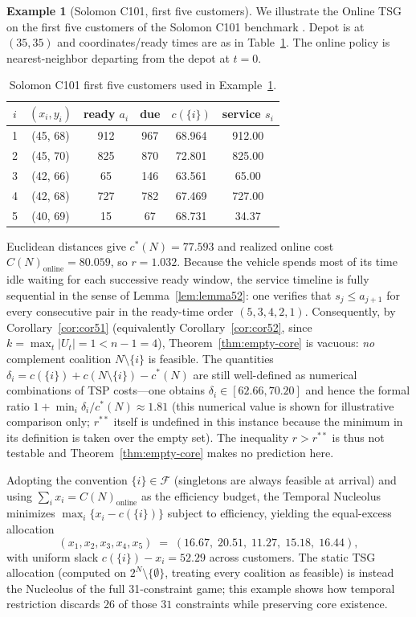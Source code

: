 \documentclass[11pt]{article}
\theoremstyle{plain}
\theoremstyle{definition}
\newtheorem{example}[theorem]{Example}
\theoremstyle{remark}
\newcommand{\F}{\mathcal{F}}
\newcommand{\cstar}{c^{\ast}}
\begin{document}
\begin{example}[Solomon C101, first five customers]
\label{ex:solomon}
We illustrate the Online TSG on the first five customers of the Solomon C101 benchmark \citep{solomon1987benchmarks}. Depot is at $(35, 35)$ and coordinates/ready times are as in Table~\ref{tab:solomon}. The online policy is nearest-neighbor departing from the depot at $t=0$.

\begin{table}[h]
\centering
\caption{Solomon C101 first five customers used in Example~\ref{ex:solomon}.}
\label{tab:solomon}
\small
\begin{tabular}{@{}cccccc@{}}
\toprule
$i$ & $(x_i, y_i)$ & ready $a_i$ & due & $c(\{i\})$ & service $s_i$ \\
\midrule
1 & (45, 68) & 912 & 967 & 68.964 & 912.00 \\
2 & (45, 70) & 825 & 870 & 72.801 & 825.00 \\
3 & (42, 66) &  65 & 146 & 63.561 &  65.00 \\
4 & (42, 68) & 727 & 782 & 67.469 & 727.00 \\
5 & (40, 69) &  15 &  67 & 68.731 &  34.37 \\
\bottomrule
\end{tabular}
\end{table}

Euclidean distances give $\cstar(N)=77.593$ and realized online cost $C(N)_{\text{online}}=80.059$, so $r = 1.032$. Because the vehicle spends most of its time idle waiting for each successive ready window, the service timeline is fully sequential in the sense of Lemma~\ref{lem:lemma52}: one verifies that $s_j \le a_{j+1}$ for every consecutive pair in the ready-time order $(5,3,4,2,1)$. Consequently, by Corollary~\ref{cor:cor51} (equivalently Corollary~\ref{cor:cor52}, since $k = \max_t|U_t| = 1 < n-1=4$), Theorem~\ref{thm:empty-core} is vacuous: \emph{no} complement coalition $N\setminus\{i\}$ is feasible. The quantities $\delta_i = c(\{i\}) + c(N\setminus\{i\}) - \cstar(N)$ are still well-defined as numerical combinations of TSP costs---one obtains $\delta_i \in [62.66, 70.20]$ and hence the formal ratio $1+\min_i \delta_i/\cstar(N) \approx 1.81$ (this numerical value is shown for illustrative comparison only; $r^{\ast\ast}$ itself is undefined in this instance because the minimum in its definition is taken over the empty set). The inequality $r > r^{\ast\ast}$ is thus not testable and Theorem~\ref{thm:empty-core} makes no prediction here.

Adopting the convention $\{i\}\in\F$ (singletons are always feasible at arrival) and using $\sum_i x_i = C(N)_{\text{online}}$ as the efficiency budget, the Temporal Nucleolus minimizes $\max_i\{x_i - c(\{i\})\}$ subject to efficiency, yielding the equal-excess allocation
\[
(x_1, x_2, x_3, x_4, x_5) \;=\; (16.67,\; 20.51,\; 11.27,\; 15.18,\; 16.44),
\]
with uniform slack $c(\{i\})-x_i = 52.29$ across customers. The static TSG allocation (computed on $2^N\setminus\{\emptyset\}$, treating every coalition as feasible) is instead the Nucleolus of the full 31-constraint game; this example shows how temporal restriction discards $26$ of those $31$ constraints while preserving core existence.
\end{example}
\end{document}

